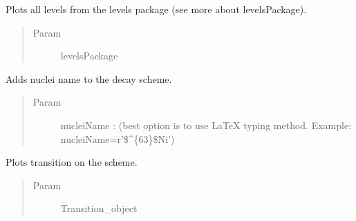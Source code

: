 \documentclass[letterpaper,10pt,english]{sphinxmanual}
\begin{document}
\begin{fulllineitems}
\begin{fulllineitems}
\begin{quote}
\begin{description}
\end{description}\end{quote}

\end{fulllineitems}


\begin{fulllineitems}
\label{\detokenize{nice_scheme_plotter:nice_scheme_plotter.Scheme.addLevelsPackage}}
Plots all levels from the levels package (see more about levelsPackage).
\begin{quote}\begin{description}
\item[{Param}] \leavevmode
levelsPackage

\end{description}\end{quote}

\end{fulllineitems}


\begin{fulllineitems}
\label{\detokenize{nice_scheme_plotter:nice_scheme_plotter.Scheme.addNucleiName}}
Adds nuclei name to the decay scheme.
\begin{quote}\begin{description}
\item[{Param}] \leavevmode
nucleiName :  (best option is to use LaTeX typing method. Example: nucleiName=r’\$\textasciicircum{}\{63\}\$Ni’)

\end{description}\end{quote}

\end{fulllineitems}


\begin{fulllineitems}
\label{\detokenize{nice_scheme_plotter:nice_scheme_plotter.Scheme.addTransition}}
Plots transition on the scheme.
\begin{quote}\begin{description}
\item[{Param}] \leavevmode
Transition\_object


\end{description}
\end{quote}
\end{fulllineitems}
\end{fulllineitems}
\end{document}
